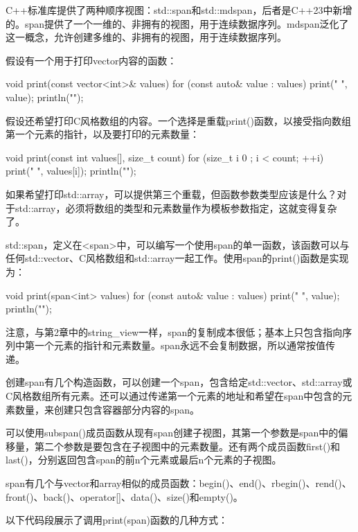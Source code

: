 
C++标准库提供了两种顺序视图：std::span和std::mdspan，后者是C++23中新增的。span提供了一个一维的、非拥有的视图，用于连续数据序列。mdspan泛化了这一概念，允许创建多维的、非拥有的视图，用于连续数据序列。


假设有一个用于打印vector内容的函数：

\begin{cpp}
void print(const vector<int>& values)
{
    for (const auto& value : values) { print("{} ", value); }
    println("");
}
\end{cpp}

假设还希望打印C风格数组的内容。一个选择是重载print()函数，以接受指向数组第一个元素的指针，以及要打印的元素数量：

\begin{cpp}
void print(const int values[], size_t count)
{
    for (size_t i { 0 }; i < count; ++i) { print("{} ", values[i]); }
    println("");
}
\end{cpp}

如果希望打印std::array，可以提供第三个重载，但函数参数类型应该是什么？对于std::array，必须将数组的类型和元素数量作为模板参数指定，这就变得复杂了。

std::span，定义在<span>中，可以编写一个使用span的单一函数，该函数可以与任何std::vector、C风格数组和std::array一起工作。使用span的print()函数是实现为：

\begin{cpp}
void print(span<int> values)
{
    for (const auto& value : values) { print("{} ", value); }
    println("");
}
\end{cpp}

注意，与第2章中的string\_view一样，span的复制成本很低；基本上只包含指向序列中第一个元素的指针和元素数量。span永远不会复制数据，所以通常按值传递。

创建span有几个构造函数，可以创建一个span，包含给定std::vector、std::array或C风格数组所有元素。还可以通过传递第一个元素的地址和希望在span中包含的元素数量，来创建只包含容器部分内容的span。

可以使用subspan()成员函数从现有span创建子视图，其第一个参数是span中的偏移量，第二个参数是要包含在子视图中的元素数量。还有两个成员函数first()和last()，分别返回包含span的前n个元素或最后n个元素的子视图。

span有几个与vector和array相似的成员函数：begin()、end()、rbegin()、rend()、front()、back()、operator[]、data()、size()和empty()。

以下代码段展示了调用print(span)函数的几种方式：

